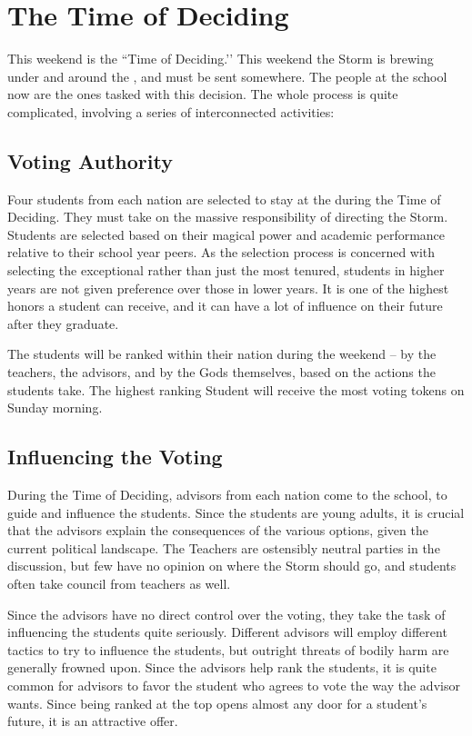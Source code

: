 \documentclass[blue]{GL2020}
\begin{document}
\section*{The Time of Deciding}
This weekend is the ``Time of Deciding.’’ This weekend the Storm is brewing under and around the \pSchool{}, and must be sent somewhere. The people at the school now are the ones tasked with this decision. The whole process is quite complicated, involving a series of interconnected activities:

\subsection*{Voting Authority}
Four students from each nation are selected to stay at the \pSc{} during the Time of Deciding. They must take on the massive responsibility of directing the Storm. Students are selected based on their magical power and academic performance relative to their school year peers. As the selection process is concerned with selecting the exceptional rather than just the most tenured, students in higher years are not given preference over those in lower years. It is one of the highest honors a student can receive, and it can have a lot of influence on their future after they graduate.

The students will be ranked within their nation during the weekend -- by the teachers, the advisors, and by the Gods themselves, based on the actions the students take. The highest ranking Student will receive the most voting tokens on Sunday morning.

\subsection*{Influencing the Voting}
During the Time of Deciding, advisors from each nation come to the school, to guide and influence the students. Since the students are young adults, it is crucial that the advisors explain the consequences of the various options, given the current political landscape. The Teachers are ostensibly neutral parties in the discussion, but few have no opinion on where the Storm should go, and students often take council from teachers as well.

Since the advisors have no direct control over the voting, they take the task of influencing the students quite seriously. Different advisors will employ different tactics to try to influence the students, but outright threats of bodily harm are generally frowned upon. Since the advisors help rank the students, it is quite common for advisors to favor the student who agrees to vote the way the advisor wants. Since being ranked at the top opens almost any door for a student’s future, it is an attractive offer.
\end{document}
